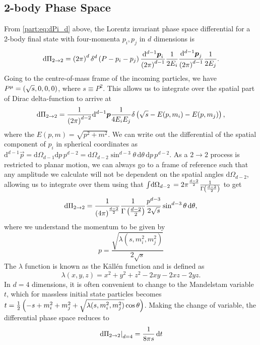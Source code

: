\documentclass[../main.tex]{subfiles}
\begin{document}
\subsection{2-body Phase Space}
From \cref{part:eq:dPi_d} above, the Lorentz invariant phase space differential for a 2-body final state with
four-momenta \(p_i, p_j\) in \(d\) dimensions is
\begin{equation}
  \mathrm{d}\Pi_{2\to 2} = \left(2\pi\right)^d \delta^d\left(P - p_i -
    p_j\right) \frac{\mathrm{d}^{d-1} \boldsymbol{p}_i}{\left(2\pi\right)^{d-1}}
  \frac{1}{2E_i}
  \frac{\mathrm{d}^{d-1} \boldsymbol{p}_j}{\left(2\pi\right)^{d-1}} \frac{1}{2E_j}.
\end{equation}
Going to the centre-of-mass frame of the incoming particles, we have \(P\^\mu =
\pclosed{\sqrt{s}, 0, 0, 0}\), where \(s \equiv P^2\).
This allows us to integrate over the spatial part of Dirac delta-function to arrive at
\begin{equation}
  \mathrm{d}\Pi_{2\to 2} = \frac{1}{\left(2\pi\right)^{d-2}}
  \mathrm{d}^{d-1} \boldsymbol{p} \frac{1}{4E_i E_j} \delta\left(\sqrt{s} -
    E(p, m_i)
    - E(p, m_j)\right),
\end{equation}
where the \(E(p, m) = \sqrt{p^2 + m^2}\).
We can write out the differential of the spatial component of \(p_i\) in
spherical coordinates as \(\mathrm{d}^{d-1} \vec{p} = \mathrm{d}\Omega_{d-1}
\mathrm{d}p \, p^{d-2} = \mathrm{d}\Omega_{d-2} \sin^{d-3}\theta \,
\mathrm{d}\theta \, \mathrm{d}p \, p^{d-2}\).
As a \(2\to 2\) process is restricted to planar motion, we can always go to a
frame of reference such that any amplitude we calculate will not be dependent
on the spatial angles \(\mathrm{d} \Omega_{d-2}\), allowing us to integrate
over them using that \(\int \!\mathrm{d}\Omega_{d-2}\, = 2 \pi^{\frac{d-2}{2}}
\frac{1}{\Gamma\left(\frac{d-2}{2}\right)}\) to get
\begin{equation}
  \label{part:eq:dPi_dtheta}
  \mathrm{d}\Pi_{2\to 2} = \frac{1}{\left(4\pi\right)^{\frac{d-2}{2}}}
  \frac{1}{\Gamma\left(\frac{d-2}{2}\right)} \frac{p^{d-3}}{2 \sqrt{s}}
  \sin^{d-3}\theta \,\mathrm{d}\theta,
\end{equation}
where we understand the momentum to be given by
\begin{equation}
  \label{part:eq:p}
  p = \frac{\sqrt{\lambda(s, m_i^2, m_j^2)}}{2\sqrt{s}}
\end{equation}
The \(\lambda\) function is known as the Källén function and is defined as
\begin{equation}
  \label{part:eq:kallen}
  \lambda(x, y, z) = x^2 + y^2 + z^2  - 2xy - 2xz - 2yz.
\end{equation}
In \(d=4\) dimensions, it is often convenient to change to the Mandelstam
variable \(t\), which for massless initial state particles becomes
\(t=\frac{1}{2}\left(-s+m_i^2+m_j^2+\sqrt{\lambda(s,m_i^2,m_j^2)}\cos\theta\right)\).
Making the change of variable, the differential phase space reduces to
\begin{equation}
  \label{part:eq:dPi_dt}
  \left.\mathrm{d}\Pi_{2\to 2}\right|_{d=4} = \frac{1}{8\pi s} \,\mathrm{d}t
\end{equation}
\end{document}
